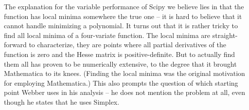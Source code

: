 \documentclass[twoside,english]{uiofysmaster}
\begin{document}
The explanation for the variable performance of Scipy we believe lies in that the function has local minima somewhere the true one -- it is hard to believe that it cannot handle minimizing a polynomial. It turns out that it is rather tricky to find all local minima of a four-variate function. The local minima are straight-forward to characterize, they are points where all partial derivatives of the function is zero and the Hesse matrix is positive-definite. But to actually find them all has proven to be numerically extensive, to the degree that it brought Mathematica to its knees. (Finding the local minima was the original motivation for employing Mathematica.) This also prompts the question of which starting point Webber uses in his analysis -- he does not mention the problem at all, even though he states that he uses Simplex.
\end{document}
